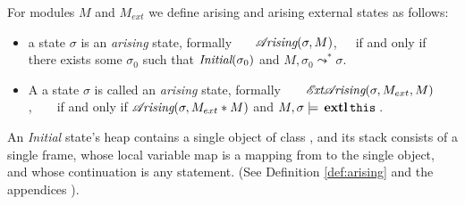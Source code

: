\begin{definition}
\label{def:arising}
For modules $M$ and $M_{ext}$ we define arising and arising external states as follows:

\begin{itemize}
\item
 a state $\sigma$ is 
{ an \emph{arising} state, formally \ \ \  $\mathcal{A}\!\textit{rising}(\sigma, M)$,\ \ \ 
if and only if there exists some $\sigma_0$ such that $\textit{Initial}(\sigma_0)$ and
$M, {\sigma_0} \leadsto^* {\sigma}$.}
\item
{A a state $\sigma$ is 
called an \emph{arising} state, formally\ \ \ \  ${\mathcal{E}\!\textit{xt}\mathcal{A}\!\textit{rising}(\sigma, M_{ext}, M)}$,\ \ \ \
if and only if $\mathcal{A}\!\textit{rising}(\sigma, M_{ext}*M)$ and $M, \sigma \models \external{}$.}
\end{itemize}
\end{definition}


An \emph{Initial} state's heap contains a single object of class , and
its  stack   consists of a single frame, whose local variable map is a
mapping from \prg{this} to the single object, and whose continuation is  any statement.
(See Definition %
\ref{def:arising} and the 
{appendices %
\cite{necessityFull}).}




